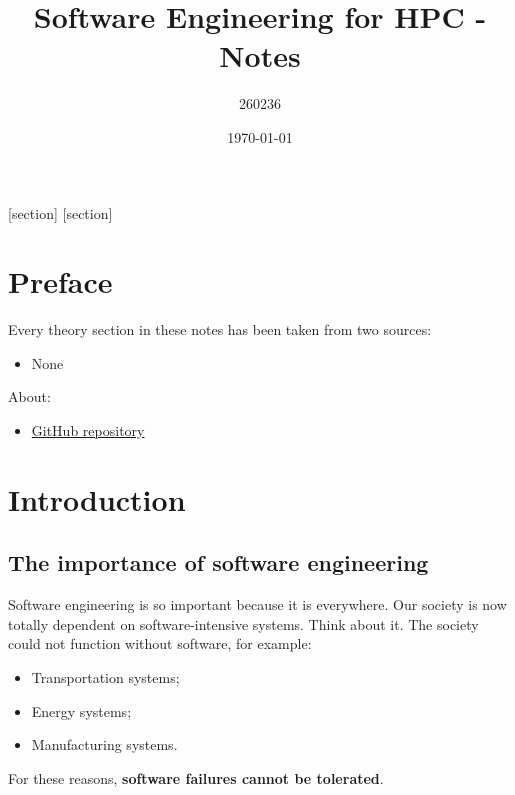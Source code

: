 \documentclass[a4paper]{article}
\begin{document}
    [section]
    [section]
    
    

    \author{260236}
	\title{Software Engineering for HPC - Notes}
	\date{\printdayoff\today}
	\maketitle

	\newpage

    \section*{Preface}

    Every theory section in these notes has been taken from two sources:
    \begin{itemize}
        \item None
    \end{itemize}
    About:
    \begin{itemize}
        \item[\faIcon{github}] \href{https://github.com/AndreVale69/HPC-E-PoliMI-university-notes}{GitHub repository}
    \end{itemize}
    
    \newpage
	
	\tableofcontents

    \newpage

    \section{Introduction}

    \subsection{The importance of software engineering}

    Software engineering is so important because it is everywhere. Our society is now totally dependent on software-intensive systems. Think about it. The society could not function without software, for example:
    \begin{itemize}
        \item Transportation systems;
        \item Energy systems;
        \item Manufacturing systems.
    \end{itemize}
    For these reasons, \textbf{software failures cannot be tolerated}.
\end{document}
